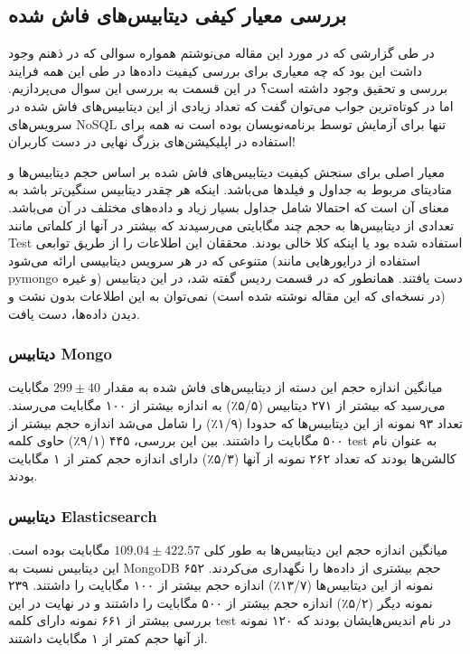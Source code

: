 \documentclass[10pt, a4paper]{article}
\begin{document}
\subsection{بررسی معیار کیفی دیتابیس‌های فاش شده}

در طی گزارشی که در مورد این مقاله می‌نوشتم همواره سوالی که در ذهنم وجود داشت این
بود که چه معیاری برای بررسی کیفیت داده‌ها در طی این همه فرایند بررسی و تحقیق
وجود داشته است؟ در این قسمت به بررسی این سوال می‌پردازیم. اما در کوتاه‌ترین جواب
می‌توان گفت که تعداد زیادی از این دیتابیس‌های فاش شده در سرویس‌های NoSQL تنها
برای آزمایش توسط برنامه‌نویسان بوده است نه همه برای استفاده در اپلیکیشن‌های بزرگ
نهایی در دست کاربران!

معیار اصلی برای سنجش کیفیت دیتابیس‌های فاش شده بر اساس حجم دیتابیس‌ها و متادیتای
مربوط به جداول و فیلد‌ها می‌باشد. اینکه هر چقدر دیتابیس سنگین‌تر باشد به معنای
آن است که احتمالا شامل جداول بسیار زیاد و داده‌های مختلف در آن می‌باشد. تعدادی
از دیتابیس‌ها به حجم چند مگابایتی می‌رسیدند که بیشتر در آنها از کلماتی مانند
Test استفاده شده بود یا اینکه کلا خالی بودند. محققان این اطلاعات را از طریق
توابعی متنوعی که در هر سرویس دیتابیسی ارائه می‌شود (استفاده از درایور‌هایی مانند
pymongo و غیره) دست یافتند. همانطور که در قسمت ردیس گفته شد، در این دیتابیس (در
نسخه‌ای که این مقاله نوشته شده است) نمی‌توان به این اطلاعات بدون نشت و دیدن
داده‌ها، دست یافت.

\subsubsection{دیتابیس Mongo}

میانگین اندازه حجم این دسته از دیتابیس‌های فاش شده به مقدار $ 299 \pm 40 $
مگابایت می‌رسید که بیشتر از ۲۷۱ دیتابیس (۵/۵٪) به اندازه بیشتر از ۱۰۰ مگابایت
می‌رسند.  تعداد ۹۳ نمونه از این دیتابیس‌ها که حدودا (۱/۹٪) را شامل می‌شد اندازه
حجم بیشتر از ۵۰۰ مگابایت را داشتند. بین این بررسی، ۴۴۵ (۹/۱٪) حاوی کلمه test به
عنوان نام کالشن‌ها بودند که تعداد ۲۶۲ نمونه از آنها (۵/۳٪) دارای اندازه حجم کمتر
از ۱ مگابایت بودند.

\subsubsection{دیتابیس Elasticsearch}

میانگین اندازه حجم این دیتابیس‌ها به طور کلی $ 109.04 \pm 422.57 $ مگابایت بوده
است. این دیتابیس نسبت به MongoDB حجم بیشتری از داده‌ها را نگهداری می‌کردند. ۶۵۲
نمونه از این دیتابیس‌ها (۱۳/۷٪) اندازه حجم بیشتر از ۱۰۰ مگابایت را داشتند. ۲۳۹
نمونه‌ دیگر (۵/۲٪) اندازه حجم بیشتر از ۵۰۰ مگابایت را داشتند و در نهایت در این
بررسی بیشتر از ۶۶۱ نمونه دارای کلمه test در نام اندیس‌هایشان بودند که ۱۲۰ نمونه
از آنها حجم کمتر از ۱ مگابایت داشتند.
\end{document}
